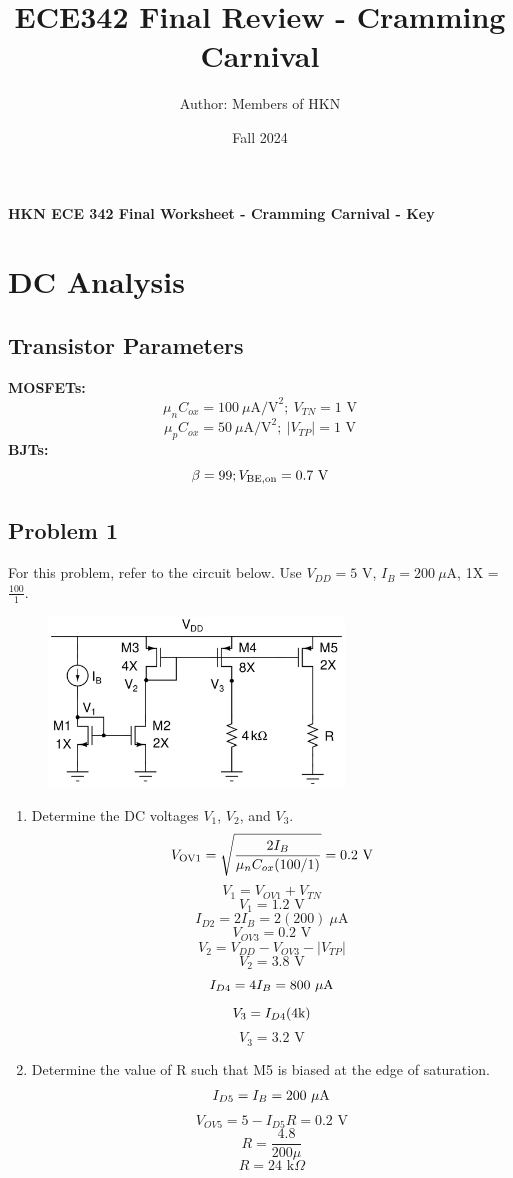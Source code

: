\documentclass{article}
\title{ECE342 Final Review - Cramming Carnival}
\author{Author: Members of HKN}
\date{Fall 2024}
\begin{document}
\begin{center}
\textbf{
{\Large HKN ECE 342 Final Worksheet - Cramming Carnival - Key}
}
\end{center} 
\noindent\makebox[\linewidth]{\rule{\linewidth}{0.2pt}}
\section*{DC Analysis}
\subsection*{Transistor Parameters}
\textbf{MOSFETs:}
$$\mu_nC_{ox} = 100\:\mu \text{A/V}^2; \ V_{TN} = 1\text{ V}$$
$$\mu_pC_{ox} = 50\:\mu \text{A/V}^2; \ |V_{TP}| = 1\text{ V}$$
\textbf{BJTs:}
$$\beta = 99; V_{\rm BE, on} = 0.7\text{ V}$$
\subsection*{Problem 1}
For this problem, refer to the circuit below. Use $V_{DD} = 5$ V, $I_B = 200\ \mu$A, 1X = $\frac{100}{1}$.
\begin{figure}[!htb]
\begin{center}
    \includegraphics[width=0.7\textwidth]{figures/cc_dc_2 (1).jpg}
\end{center}
\end{figure}
\begin{enumerate}[label=\textbf{(\alph*)}]
    \item Determine the DC voltages $V_1$, $V_2$, and $V_3$.
$$V_{\rm OV1} = \sqrt{\frac{2I_{B}}{\mu_nC_{ox}(100/1)}} = 0.2\text{ V}$$
$$V_1 = V_{OV1} + V_{TN}$$
$$\boxed{V_1 = 1.2\text{ V}}$$
$$I_{D2} = 2I_B = 2(200)\ \mu\text{A}$$
$$V_{OV3} = 0.2 \text{ V}$$
$$V_2 = V_{DD} - V_{OV3} - |V_{TP}|$$
$$\boxed{V_2 = 3.8\text{ V}}$$
$$I_{D4} = 4I_B = 800\ \mu \rm A$$
$$V_{3} = I_{D4}(4\rm k)$$
$$\boxed{V_3 = 3.2\text{ V}}$$
\newpage
    \item Determine the value of R such that M5 is biased at the edge of saturation.
$$I_{D5} = I_B = 200\ \mu \rm A$$
$$V_{OV5} = 5 - I_{D5}R = 0.2\text{ V}$$
$$R = \frac{4.8}{200 \mu}$$
$$\boxed{R = 24 \text{ k} \Omega}$$
\end{enumerate}
\newpage
\end{document}
